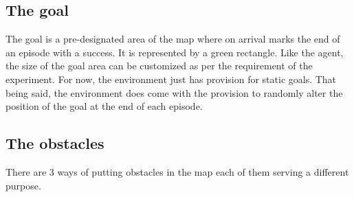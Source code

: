 \subsection{The goal}
The goal is a pre-designated area of the map where on arrival marks the end of an episode with a success. It is represented by a green rectangle. Like the agent, the size of the goal area can be customized as per the requirement of the experiment. For now, the environment just has provision for static goals. That being said, the environment does come with the provision to randomly alter the position of the goal at the end of each episode.


\subsection{The obstacles}
There are 3 ways of putting obstacles in the map each of them serving a different purpose.
